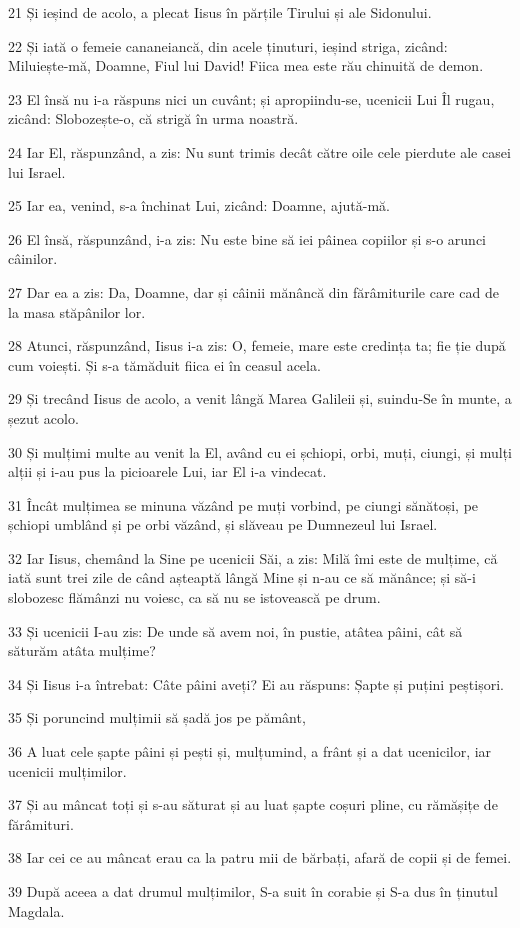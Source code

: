 \par 21 Și ieșind de acolo, a plecat Iisus în părțile Tirului și ale Sidonului.
\par 22 Și iată o femeie cananeiancă, din acele ținuturi, ieșind striga, zicând: Miluiește-mă, Doamne, Fiul lui David! Fiica mea este rău chinuită de demon.
\par 23 El însă nu i-a răspuns nici un cuvânt; și apropiindu-se, ucenicii Lui Îl rugau, zicând: Slobozește-o, că strigă în urma noastră.
\par 24 Iar El, răspunzând, a zis: Nu sunt trimis decât către oile cele pierdute ale casei lui Israel.
\par 25 Iar ea, venind, s-a închinat Lui, zicând: Doamne, ajută-mă.
\par 26 El însă, răspunzând, i-a zis: Nu este bine să iei pâinea copiilor și s-o arunci câinilor.
\par 27 Dar ea a zis: Da, Doamne, dar și câinii mănâncă din fărâmiturile care cad de la masa stăpânilor lor.
\par 28 Atunci, răspunzând, Iisus i-a zis: O, femeie, mare este credința ta; fie ție după cum voiești. Și s-a tămăduit fiica ei în ceasul acela.
\par 29 Și trecând Iisus de acolo, a venit lângă Marea Galileii și, suindu-Se în munte, a șezut acolo.
\par 30 Și mulțimi multe au venit la El, având cu ei șchiopi, orbi, muți, ciungi, și mulți alții și i-au pus la picioarele Lui, iar El i-a vindecat.
\par 31 Încât mulțimea se minuna văzând pe muți vorbind, pe ciungi sănătoși, pe șchiopi umblând și pe orbi văzând, și slăveau pe Dumnezeul lui Israel.
\par 32 Iar Iisus, chemând la Sine pe ucenicii Săi, a zis: Milă îmi este de mulțime, că iată sunt trei zile de când așteaptă lângă Mine și n-au ce să mănânce; și să-i slobozesc flămânzi nu voiesc, ca să nu se istovească pe drum.
\par 33 Și ucenicii I-au zis: De unde să avem noi, în pustie, atâtea pâini, cât să săturăm atâta mulțime?
\par 34 Și Iisus i-a întrebat: Câte pâini aveți? Ei au răspuns: Șapte și puțini peștișori.
\par 35 Și poruncind mulțimii să șadă jos pe pământ,
\par 36 A luat cele șapte pâini și pești și, mulțumind, a frânt și a dat ucenicilor, iar ucenicii mulțimilor.
\par 37 Și au mâncat toți și s-au săturat și au luat șapte coșuri pline, cu rămășițe de fărâmituri.
\par 38 Iar cei ce au mâncat erau ca la patru mii de bărbați, afară de copii și de femei.
\par 39 După aceea a dat drumul mulțimilor, S-a suit în corabie și S-a dus în ținutul Magdala.

